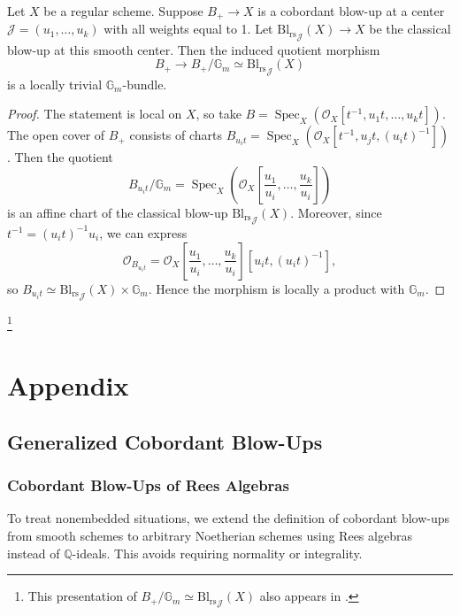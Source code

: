 \documentclass{amsart}
\newcommand{\QQ}{{\mathbb{Q}}}
\newcommand{\GG}{{\mathbb{G}}}
\newcommand{\cJ}{{\mathcal J}}
\newcommand{\cO}{{\mathcal O}}
\newcommand{\Spec}{\operatorname{Spec}}
\newcommand{\Bl}{{\operatorname{Bl_{rs}}}}
\renewcommand{\setminus}{\smallsetminus}
\begin{document}
\begin{lemma}
Let \( X \) be a regular scheme. Suppose \( B_+ \to X \) is a cobordant blow-up at a center \( \cJ = (u_1, \ldots, u_k) \) with all weights equal to 1. Let \( \Bl_{\cJ}(X) \to X \) be the classical blow-up at this smooth center. Then the induced quotient morphism
\[
B_+ \to B_+ / \GG_m \simeq \Bl_{\cJ}(X)
\]
is a locally trivial \( \GG_m \)-bundle.
\end{lemma}

\begin{proof}
The statement is local on \( X \), so take \( B = \Spec_X(\cO_X[t^{-1}, u_1 t, \ldots, u_k t]) \). The open cover of \( B_+ \) consists of charts \( B_{u_i t} = \Spec_X(\cO_X[t^{-1}, u_j t, (u_i t)^{-1}]) \). Then the quotient
\[
B_{u_i t} / \GG_m = \Spec_X\left(\cO_X\left[\frac{u_1}{u_i}, \ldots, \frac{u_k}{u_i}\right]\right)
\]
is an affine chart of the classical blow-up \( \Bl_{\cJ}(X) \). Moreover, since \( t^{-1} = (u_i t)^{-1} u_i \), we can express
\[
\cO_{B_{u_i t}} = \cO_X\left[\frac{u_1}{u_i}, \ldots, \frac{u_k}{u_i}\right][u_i t, (u_i t)^{-1}],
\]
so \( B_{u_i t} \simeq \Bl_{\cJ}(X) \times \GG_m \). Hence the morphism is locally a product with \( \GG_m \).
\end{proof}
\footnote{This presentation of \( B_+ / \GG_m \simeq \Bl_{\cJ}(X) \) also appears in \cite[Definition 5.1.5]{HS06}.}
\section{Appendix}
\subsection{Generalized Cobordant Blow-Ups}\label{general}



\subsubsection{ Cobordant Blow-Ups of Rees Algebras}

To treat nonembedded situations, we extend the definition of cobordant blow-ups from smooth schemes to arbitrary Noetherian schemes using Rees algebras instead of $\QQ$-ideals. This avoids requiring normality or integrality.
\end{document}
